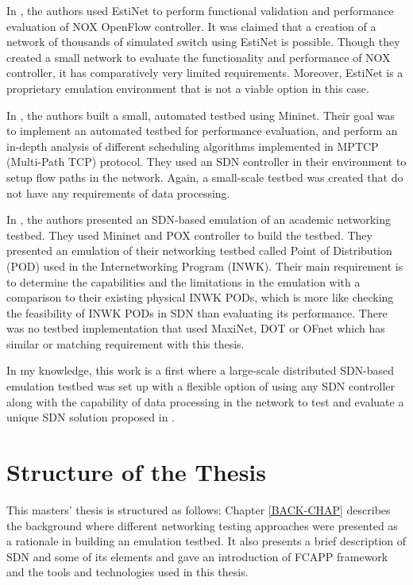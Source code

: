 In \cite{estinettestbed}, the authors used EstiNet to perform functional validation and performance evaluation of NOX OpenFlow controller. It was claimed that a creation of a network of thousands of simulated switch using EstiNet is possible. Though they created a small network to evaluate the functionality and performance of NOX controller, it has comparatively very limited requirements. Moreover, EstiNet is a proprietary emulation environment that is not a viable option in this case. 

In \cite{7503872}, the authors built a small, automated testbed using Mininet. Their goal was to implement an automated testbed for performance evaluation, and perform an in-depth analysis of different scheduling algorithms implemented in MPTCP (Multi-Path TCP) protocol. They used an SDN controller in their environment to setup flow paths in the network. Again, a small-scale testbed was created that do not have any requirements of data processing. 

In \cite{7726828}, the authors presented an SDN-based emulation of an academic networking testbed. They used Mininet and POX controller to build the testbed. They presented an emulation of their networking testbed called Point of Distribution (POD) used in the Internetworking Program (INWK). Their main requirement is to determine the capabilities and the limitations in the emulation with a comparison to their existing physical INWK PODs, which is more like checking the feasibility of INWK PODs in SDN than evaluating its performance. There was no testbed implementation that used MaxiNet, DOT or OFnet which has similar or matching requirement with this thesis.

In my knowledge, this work is a first where a large-scale distributed SDN-based emulation testbed was set up with a flexible option of using any SDN controller along with the capability of data processing in the network to test and evaluate a unique SDN solution proposed in \cite{7343600}.

\section{Structure of the Thesis}
This masters' thesis is structured as follows: Chapter \ref{BACK-CHAP} describes the background where different networking testing approaches were presented as a rationale in building an emulation testbed. It also presents a brief description of SDN and some of its elements and gave an introduction of FCAPP framework and the tools and technologies used in this thesis. 

